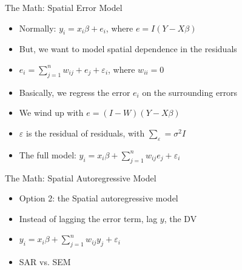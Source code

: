 \documentclass[aspectratio = 169, 12pt]{beamer}\usepackage[]{graphicx}\usepackage[]{color}
\begin{document}
\begin{frame}{The Math: Spatial Error Model}
\begin{itemize}
\item Normally: $y_i = x_{i}\beta + e_i$, where $e = I(Y- X\beta)$
\item But, we want to model spatial dependence in the residuals
\item $e_{i} = \sum_{j=1}^n w_{ij} + e_{j} + \varepsilon_{i}$, where $w_{ii} = 0$
\item Basically, we regress the error $e_i$ on the surrounding errors
\item We wind up with $e = (I-W)(Y- X\beta)$
\item $\varepsilon$ is the residual of residuals, with $\sum_{\varepsilon} = \sigma^{2}I$
\item The full model: $y_{i} = x_{i}\beta + \sum_{j=1}^{n} w_{ij}e_{j} + \varepsilon_{i}$
\end{itemize}
\end{frame}

\begin{frame}{The Math: Spatial Autoregressive Model}
\begin{itemize}
\item Option 2: the Spatial autoregressive model
\item Instead of lagging the error term, lag $y$, the DV
\item $y_{i} = x_{i}\beta + \sum_{j=1}^{n} w_{ij}y_{j} + \varepsilon_{i}$
\item SAR vs. SEM
\end{itemize}
\end{frame}
\end{document}
